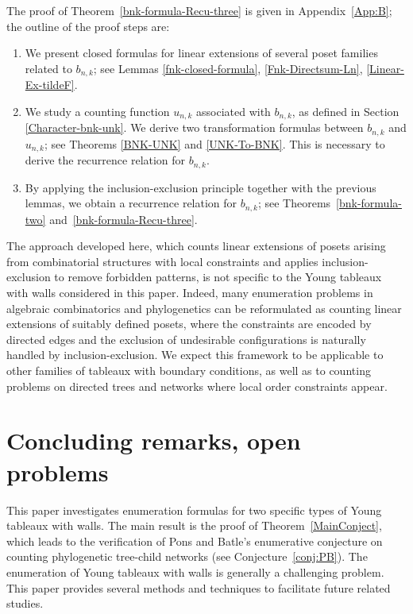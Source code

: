 \documentclass[reqno, 12pt]{article}
\theoremstyle{mydefinition}
\theoremstyle{myremark}
\numberwithin{algorithm}{section}
\begin{document}
The proof of Theorem~\ref{bnk-formula-Recu-three} is given in Appendix~\ref{App:B}; the outline of the proof steps are:
\begin{enumerate}
\item We present closed formulas for linear extensions of several poset families related to $b_{n,k}$; see Lemmas \ref{fnk-closed-formula}, \ref{Fnk-Directsum-Ln}, \ref{Linear-Ex-tildeF}.

\item We study a counting function $u_{n,k}$ associated with $b_{n,k}$, as defined in Section \ref{Character-bnk-unk}.
We derive two transformation formulas between $b_{n,k}$ and $u_{n,k}$; see Theorems \ref{BNK-UNK} and \ref{UNK-To-BNK}.
This is necessary to derive the recurrence relation for $b_{n,k}$.

\item By applying the inclusion-exclusion principle together with the previous lemmas, we obtain a recurrence relation for $b_{n,k}$; see Theorems~\ref{bnk-formula-two} and~\ref{bnk-formula-Recu-three}.
\end{enumerate}

The approach developed here, which counts linear extensions of posets arising from combinatorial structures with local constraints and applies inclusion-exclusion to remove forbidden patterns, is not specific to the Young tableaux with walls considered in this paper.
Indeed, many enumeration problems in algebraic combinatorics and phylogenetics can be reformulated as counting linear extensions of suitably defined posets, where the constraints are encoded by directed edges and the exclusion of undesirable configurations is naturally handled by inclusion-exclusion.
We expect this framework to be applicable to other families of tableaux with boundary conditions, as well as to counting problems on directed trees and networks where local order constraints appear.


\section{Concluding remarks, open problems}
\label{Section-concluding-remark}

This paper investigates enumeration formulas for two specific types of Young tableaux with walls.
The main result is the proof of Theorem~\ref{MainConject}, which leads to the verification of Pons and Batle's enumerative  conjecture on counting phylogenetic tree-child networks (see Conjecture~\ref{conj:PB}).
The enumeration of Young tableaux with walls is generally a challenging problem.
This paper provides several methods and techniques to facilitate future related studies.
\end{document}
